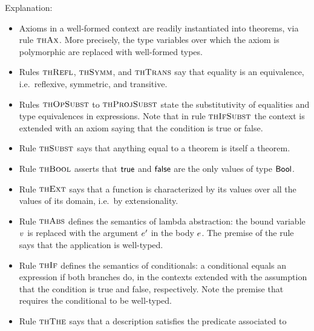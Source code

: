 Explanation:
\begin{itemize}
\item
Axioms in a well-formed context are readily instantiated into theorems, via
rule $\textsc{thAx}$. More precisely, the type variables over which the axiom is
polymorphic are replaced with well-formed types.
\item
Rules $\textsc{thRefl}$, $\textsc{thSymm}$, and $\textsc{thTrans}$ say that equality is an
equivalence, i.e.\ reflexive, symmetric, and transitive.
\item
Rules $\textsc{thOpSubst}$ to $\textsc{thProjSubst}$ state the substitutivity of equalities and
type equivalences in expressions. Note that in rule $\textsc{thIfSubst}$ the context is
extended with an axiom saying that the condition is true or false.
\item
Rule $\textsc{thSubst}$ says that anything equal to a theorem is itself a theorem.
\item
Rule $\textsc{thBool}$ asserts that $\mathsf{true}$ and $\mathsf{false}$ are the only values of type
$\mathsf{Bool}$.
\item
Rule $\textsc{thExt}$ says that a function is characterized by its values over all
the values of its domain, i.e.\ by extensionality.
\item
Rule $\textsc{thAbs}$ defines the semantics of lambda abstraction: the bound variable
$v$ is replaced with the argument $e'$ in the body $e$. The premise
of the rule says that the application is well-typed.
\item
Rule $\textsc{thIf}$ defines the semantics of conditionals: a conditional equals an
expression if both branches do, in the contexts extended with the assumption
that the condition is true and false, respectively. Note the premise that
requires the conditional to be well-typed.
\item
Rule $\textsc{thThe}$ says that a description satisfies the predicate associated to

\end{itemize}
